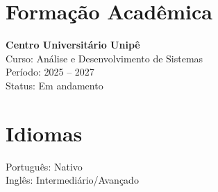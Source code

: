\documentclass[10pt,a4paper]{article}
\begin{document}
\section*{Formação Acadêmica}

\textbf{Centro Universitário Unipê} \\
Curso: Análise e Desenvolvimento de Sistemas \\
Período: 2025 -- 2027 \\
Status: Em andamento

\section*{Idiomas}

Português: Nativo \\
Inglês: Intermediário/Avançado
\end{document}
